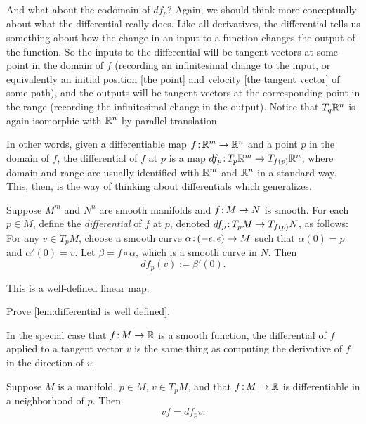And what about the codomain of $df_p$? Again, we should think more conceptually about what the differential really does. Like all derivatives, the differential tells us something about how the change in an input to a function changes the output of the function. So the inputs to the differential will be tangent vectors at some point in the domain of $f$ (recording an infinitesimal change to the input, or equivalently an initial position [the point] and velocity [the tangent vector] of some path), and the outputs will be tangent vectors at the corresponding point in the range (recording the infinitesimal change in the output). Notice that $T_q \mathbb{R}^n$ is again isomorphic with $\mathbb{R}^n$ by parallel translation.

In other words, given a differentiable map $f \colon\thinspace\!\! \mathbb{R}^m \to \mathbb{R}^n$ and a point $p$ in the domain of $f$, the differential of $f$ at $p$ is a map $df_p \colon\thinspace\!\! T_p \mathbb{R}^m \to T_{f(p)}\mathbb{R}^n$, where domain and range are usually identified with $\mathbb{R}^m$ and $\mathbb{R}^n$ in a standard way. This, then, is the way of thinking about differentials which generalizes.

\begin{definition}\label{def:differential}
	Suppose $M^m$ and $N^n$ are smooth manifolds and $f \colon\thinspace\!\! M \to N$ is smooth. For each $p \in M$, define the \emph{differential} of $f$ at $p$, denoted $df_p\colon\thinspace\!\! T_p M \to T_{f(p)}N$, as follows: For any $v \in T_p M$, choose a smooth curve $\alpha \colon\thinspace\!\! (-\epsilon, \epsilon) \to M$ such that $\alpha(0) = p$ and $\alpha'(0) = v$. Let $\beta = f \circ \alpha$, which is a smooth curve in $N$. Then
	\[
		df_p(v) := \beta'(0).
	\]
\end{definition}

\begin{lemma}\label{lem:differential is well defined}
	This is a well-defined linear map.
\end{lemma}

\begin{exercise}
	Prove \cref{lem:differential is well defined}.
\end{exercise}

In the special case that $f\colon\thinspace\!\! M \to \mathbb{R}$ is a smooth function, the differential of $f$ applied to a tangent vector $v$ is the same thing as computing the derivative of $f$ in the direction of $v$:

\begin{lemma}\label{lem:vector fields and differentials}
	Suppose $M$ is a manifold, $p \in M$, $v \in T_pM$, and that $f\colon\thinspace\!\! M \to \mathbb{R}$ is differentiable in a neighborhood of $p$. Then
	\[
		vf = df_p v.
	\]
\end{lemma}

